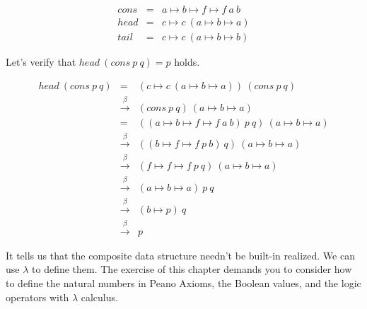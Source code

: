 \documentclass{article}
\begin{document}
\[
\begin{array}{rcl}
cons & = & a \mapsto b \mapsto f \mapsto f\ a\ b \\
head & = & c \mapsto c\ (a \mapsto b \mapsto a) \\
tail & = & c \mapsto c\ (a \mapsto b \mapsto b)
\end{array}
\]

Let's verify that $head\ (cons\ p\ q) = p$ holds.

\[
\begin{array}{rcl}
head\ (cons\ p\ q) & = & (c \mapsto c\ (a \mapsto b \mapsto a))\ (cons\ p\ q) \\
                   & \xrightarrow{\beta} & (cons\ p\ q)\ (a \mapsto b \mapsto a) \\
                   & = & ((a \mapsto b \mapsto f \mapsto f\ a\ b)\ p\ q)\ (a \mapsto b \mapsto a) \\
                   & \xrightarrow{\beta} & ((b \mapsto f \mapsto f\ p\ b)\ q)\ (a \mapsto b \mapsto a) \\
                   & \xrightarrow{\beta} & (f \mapsto f \mapsto f\ p\ q)\ (a \mapsto b \mapsto a) \\
                   & \xrightarrow{\beta} & (a \mapsto b \mapsto a)\ p\ q \\
                   & \xrightarrow{\beta} & (b \mapsto p)\ q \\
                   & \xrightarrow{\beta} & p
\end{array}
\]

It tells us that the composite data structure needn't be built-in realized. We can use $\lambda$ to define them. The exercise of this chapter demands you to consider how to define the natural numbers in Peano Axioms, the Boolean values, and the logic operators with $\lambda$ calculus.
\end{document}
